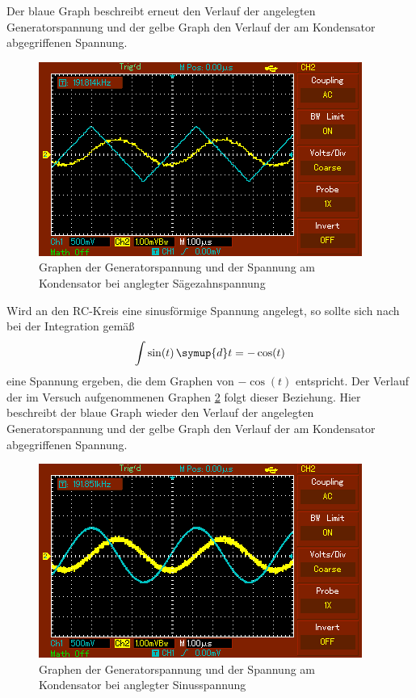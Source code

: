 Der blaue Graph beschreibt erneut den Verlauf der angelegten Generatorspannung und
der gelbe Graph den Verlauf der am Kondensator abgegriffenen Spannung.
\begin{figure}
  \centering
  \includegraphics{data/integration_saegezahn.PNG}
  \caption{Graphen der Generatorspannung und der Spannung am Kondensator bei anglegter
  Sägezahnspannung}
  \label{fig:saegezahn}
\end{figure}
Wird an den RC-Kreis eine sinusförmige Spannung angelegt, so sollte sich nach bei der
Integration gemäß
\begin{equation}
  \int \sin(t) \, \symup{d}t=-\cos(t)
\end{equation}
eine Spannung ergeben, die dem Graphen von $-\cos(t)$ entspricht. Der Verlauf der
im Versuch aufgenommenen Graphen \ref{fig:sinus} folgt dieser Beziehung. Hier beschreibt der blaue Graph
wieder den Verlauf der angelegten Generatorspannung und der gelbe Graph den Verlauf der
am Kondensator abgegriffenen Spannung.
\begin{figure}
  \centering
  \includegraphics{data/integration_sinus.PNG}
  \caption{Graphen der Generatorspannung und der Spannung am Kondensator bei anglegter
  Sinusspannung}
  \label{fig:sinus}
\end{figure}
